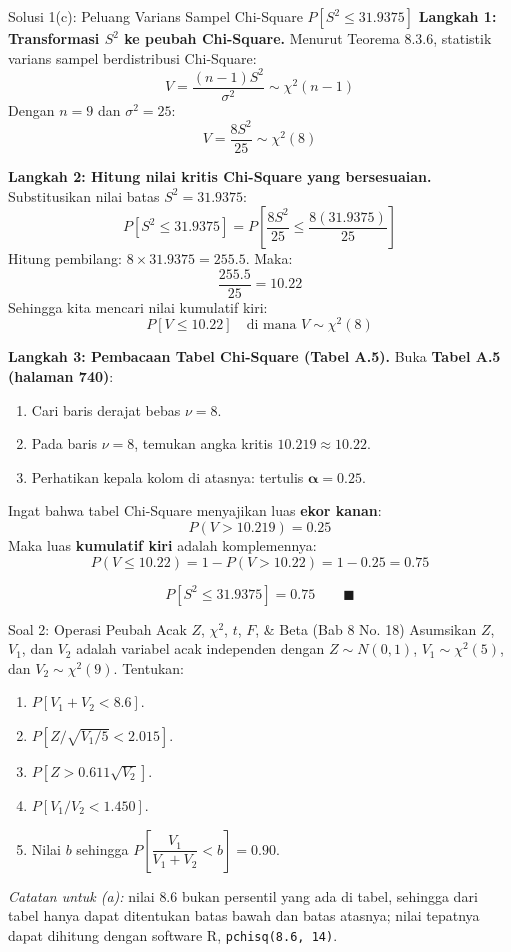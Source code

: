 \documentclass[10pt,twoside]{article}
\begin{document}
\begin{solbox}{Solusi 1(c): Peluang Varians Sampel Chi-Square $P[S^2 \le 31.9375]$}
\textbf{Langkah 1: Transformasi $S^2$ ke peubah Chi-Square.}
Menurut Teorema 8.3.6, statistik varians sampel berdistribusi Chi-Square:
\[
V = \frac{(n-1)S^2}{\sigma^2} \sim \chi^2(n-1)
\]
Dengan $n = 9$ dan $\sigma^2 = 25$:
\[
V = \frac{8 S^2}{25} \sim \chi^2(8)
\]

\textbf{Langkah 2: Hitung nilai kritis Chi-Square yang bersesuaian.}
Substitusikan nilai batas $S^2 = 31.9375$:
\[
P[S^2 \le 31.9375] = P\left[\frac{8 S^2}{25} \le \frac{8(31.9375)}{25}\right]
\]
Hitung pembilang: $8 \times 31.9375 = 255.5$. Maka:
\[
\frac{255.5}{25} = 10.22
\]
Sehingga kita mencari nilai kumulatif kiri:
\[
P[V \le 10.22] \quad \text{di mana } V \sim \chi^2(8)
\]

\textbf{Langkah 3: Pembacaan Tabel Chi-Square (Tabel A.5).}
Buka \textbf{Tabel A.5 (halaman 740)}:
\begin{enumerate}
  \item Cari baris derajat bebas $\nu = 8$.
  \item Pada baris $\nu = 8$, temukan angka kritis $\mathbf{10.219} \approx 10.22$.
  \item Perhatikan kepala kolom di atasnya: tertulis $\mathbf{\alpha = 0.25}$.
\end{enumerate}
Ingat bahwa tabel Chi-Square menyajikan luas \textbf{ekor kanan}:
\[
P(V > 10.219) = 0.25
\]
Maka luas \textbf{kumulatif kiri} adalah komplemennya:
\[
P(V \le 10.22) = 1 - P(V > 10.22) = 1 - 0.25 = 0.75
\]

\[
\boxed{P[S^2 \le 31.9375] = 0.75} \qquad \blacksquare
\]
\end{solbox}

\begin{soalbox}{Soal 2: Operasi Peubah Acak $Z$, $\chi^2$, $t$, $F$, \& Beta (Bab 8 No. 18)}
Asumsikan $Z$, $V_1$, dan $V_2$ adalah variabel acak independen dengan $Z \sim N(0, 1)$, $V_1 \sim \chi^2(5)$, dan $V_2 \sim \chi^2(9)$. Tentukan:
\begin{enumerate}[label=(\alph*)]
    \item $P[V_1 + V_2 < 8.6]$.
    \item $P[Z / \sqrt{V_1 / 5} < 2.015]$.
    \item $P[Z > 0.611\sqrt{V_2}]$.
    \item $P[V_1 / V_2 < 1.450]$.
    \item Nilai $b$ sehingga $P\left[\dfrac{V_1}{V_1 + V_2} < b\right] = 0.90$.
\end{enumerate}
\textit{Catatan untuk (a):} nilai $8.6$ bukan persentil yang ada di tabel, sehingga dari tabel hanya dapat ditentukan batas bawah dan batas atasnya; nilai tepatnya dapat dihitung dengan software R, \texttt{pchisq(8.6, 14)}.
\end{soalbox}
\end{document}
